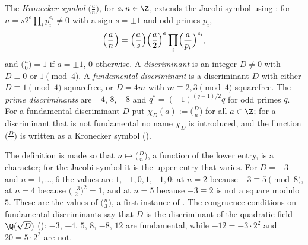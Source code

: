 \begin{definition}\label{def:rings:kronecker}
The \emph{Kronecker symbol} $\bigl(\frac an\bigr)$, for $a,n\in\Z$, extends the Jacobi symbol using : for $n=s2^e\prod_ip_i^{e_i}\ne0$
with a sign $s=\pm1$ and odd primes $p_i$,
\[
\Bigl(\frac an\Bigr)=\Bigl(\frac as\Bigr)\Bigl(\frac a2\Bigr)^e\prod_i\Bigl(\frac a{p_i}\Bigr)^{e_i},
\]
and $\bigl(\frac a0\bigr)=1$ if $a=\pm1$, $0$ otherwise. A \emph{discriminant} is an integer $D\ne0$ with $D\equiv0$ or $1\pmod4$. A \emph{fundamental
discriminant} is a discriminant $D$ with either $D\equiv1\pmod4$ squarefree, or $D=4m$ with $m\equiv2,3\pmod4$ squarefree. The \emph{prime
discriminants} are $-4$, $8$, $-8$ and $q^*=(-1)^{(q-1)/2}q$ for odd primes $q$. For a fundamental discriminant $D$ put $\chi_D(a):=\bigl(\frac Da\bigr)$ for all
$a\in\Z$; for a discriminant that is not fundamental no name $\chi_D$ is introduced, and the function $\bigl(\frac D\cdot\bigr)$ is written as a Kronecker
symbol ().
\end{definition}

The definition is made so that $n\mapsto\bigl(\frac Dn\bigr)$, a function of the lower entry, is a character; for the Jacobi symbol it is the upper
entry that varies. For $D=-3$ and $n=1,\dots,6$ the values are $1,-1,0,1,-1,0$: at $n=2$ because $-3\equiv5\pmod8$, at $n=4$ because
$\bigl(\frac{-3}2\bigr)^2=1$, and at $n=5$ because $-3\equiv2$ is not a square modulo $5$. These are the values of $\bigl(\frac n3\bigr)$, a first instance of
. The congruence conditions on fundamental discriminants say that $D$ is the discriminant of the quadratic field
$\Q(\sqrt D)$ (): $-3$, $-4$, $5$, $8$, $-8$, $12$ are fundamental, while $-12=-3\cdot2^2$ and $20=5\cdot2^2$ are not.

